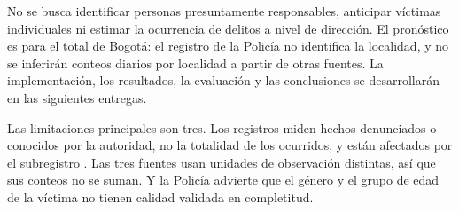 No se busca identificar personas presuntamente responsables, anticipar víctimas individuales ni estimar la ocurrencia de delitos a nivel de dirección. El pronóstico es para el total de Bogotá: el registro de la Policía no identifica la localidad, y no se inferirán conteos diarios por localidad a partir de otras fuentes. La implementación, los resultados, la evaluación y las conclusiones se desarrollarán en las siguientes entregas.

Las limitaciones principales son tres. Los registros miden hechos denunciados o conocidos por la autoridad, no la totalidad de los ocurridos, y están afectados por el subregistro \citep{riascos2023}. Las tres fuentes usan unidades de observación distintas, así que sus conteos no se suman. Y la Policía advierte que el género y el grupo de edad de la víctima no tienen calidad validada en completitud.
